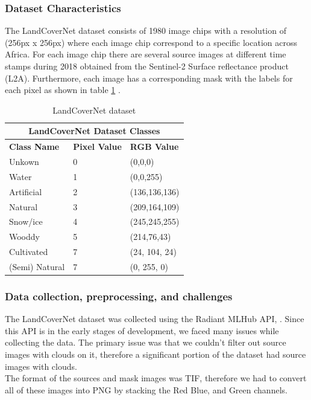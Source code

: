 \documentclass[conference]{IEEEtran}
\begin{document}
\subsubsection{Dataset Characteristics}
The LandCoverNet dataset consists of 1980 image chips with a resolution of (256px x 256px) where each image chip correspond to a specific location across Africa. For each image chip there are several source images at different time stamps during 2018  obtained from the Sentinel-2 Surface reflectance product (L2A). Furthermore, each image has a corresponding mask with the labels for each pixel as shown in table \ref{landcovernet_dataset} \cite{DBLP:journals/corr/abs-2012-03111}. 





\begin{table}[htbp]
\centering
\caption{LandCoverNet dataset}
\begin{tabular}{|p{1.8cm}|p{0.6cm}|p{1.6cm}|}
 \hline
 \multicolumn{3}{|c|}{\textbf{LandCoverNet Dataset Classes}} \\
 \hline
 \textbf{Class Name} & \textbf{Pixel Value}& \textbf{RGB Value} \\
 \hline
 Unkown & 0  & (0,0,0)\\ 
 \hline
 Water & 1  & (0,0,255)\\ 
 \hline
 Artificial & 2  & (136,136,136)\\ 
 \hline
 Natural & 3  & (209,164,109)\\ 
 \hline
 Snow/ice & 4 &  (245,245,255)\\ 
 \hline
 Wooddy & 5  & (214,76,43)\\ 
 \hline
 Cultivated & 7  & (24, 104, 24)\\ 
 \hline
 (Semi) Natural & 7  & (0, 255, 0)\\ 
 \hline
\end{tabular}
\label{landcovernet_dataset}
\end{table}

\subsubsection{Data collection, preprocessing, and challenges}

The LandCoverNet dataset \cite{DBLP:journals/corr/abs-2012-03111} was collected using the Radiant MLHub API, \cite{radiant_mlhub_api}. Since this API is in the early stages of development, we faced many issues while collecting the data. The primary issue was that we couldn't filter out source images with clouds on it, therefore a significant portion of the dataset had source images with clouds. \\ \indent
The format of the sources and mask images was TIF, therefore we had to convert all of these images into PNG by stacking the Red Blue, and Green channels.
\end{document}
